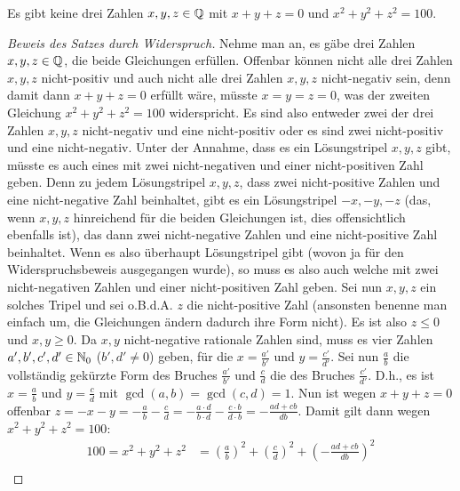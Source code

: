\begin{thm}
    Es gibt keine drei Zahlen $x, y, z \in \mathbb{Q}$ mit $x + y + z = 0$ und $x^2 + y^2 + z^2 = 100$. \label{aufgabe_2}
\end{thm}
\begin{proof}[Beweis des Satzes durch Widerspruch]
    Nehme man an, es gäbe drei Zahlen $x, y, z \in \mathbb{Q}$, die beide Gleichungen erfüllen. Offenbar können nicht alle 
    drei Zahlen $x, y, z$ nicht-positiv und auch nicht alle drei Zahlen $x, y, z$ nicht-negativ sein, denn damit 
    dann $x+y+z = 0$ erfüllt wäre, müsste $x = y = z = 0$, was der zweiten Gleichung $x^2+y^2+z^2 = 100$ 
    widerspricht. Es sind also entweder zwei der drei Zahlen $x, y, z$ nicht-negativ und eine nicht-positiv oder es 
    sind zwei nicht-positiv und eine nicht-negativ. Unter der Annahme, dass es ein Lösungstripel $x, y, z$ gibt, 
    müsste es auch eines mit zwei nicht-negativen und einer nicht-positiven Zahl geben. Denn zu jedem Lösungstripel 
    $x, y, z$, dass zwei nicht-positive Zahlen und eine nicht-negative Zahl beinhaltet, gibt es ein Lösungstripel 
    $-x,-y,-z$ (das, wenn $x, y, z$ hinreichend für die beiden Gleichungen ist, dies offensichtlich ebenfalls ist), 
    das dann zwei nicht-negative Zahlen und eine nicht-positive Zahl beinhaltet. Wenn es also überhaupt 
    Lösungstripel gibt (wovon ja für den Widerspruchsbeweis ausgegangen wurde), so muss es also auch welche mit zwei 
    nicht-negativen Zahlen und einer nicht-positiven Zahl geben. Sei nun $x, y, z$ ein solches Tripel und sei 
    o.B.d.A. $z$ die nicht-positive Zahl (ansonsten benenne man einfach um, die Gleichungen ändern dadurch ihre Form 
    nicht). Es ist also $z \leq 0$ und $x, y \geq 0$. Da $x, y$ nicht-negative rationale Zahlen sind, muss es vier 
    Zahlen $a', b', c', d' \in \mathbb{N}_0$ ($b', d' \neq 0$) geben, für die $x = \frac{a'}{b'}$ und $y = \frac{c'}{d'}$. 
    Sei nun $\frac{a}{b}$ die vollständig gekürzte Form des Bruches $\frac{a'}{b'}$ und $\frac{c}{d}$ die des 
    Bruches $\frac{c'}{d'}$. D.h., es ist $x = \frac{a}{b}$ und $y = \frac{c}{d}$ mit $\gcd(a, b) = \gcd(c, d) = 1$. 
    Nun ist wegen $x+y+z=0$ offenbar $z = -x-y = -\frac{a}{b} - \frac{c}{d} = -\frac{a \cdot d}{b \cdot d} - 
    \frac{c \cdot b}{d \cdot b} = - \frac{ad+cb}{db}$. Damit gilt dann wegen $x^2+y^2+z^2 = 100$:
    \begin{align*}
        100 = x^2+y^2+z^2 &= \left( \frac{a}{b} \right)^2 + \left( \frac{c}{d} \right)^2 + \left( -\frac{ad+cb}{db} \right)^2\\

\end{align*}
\end{proof}
